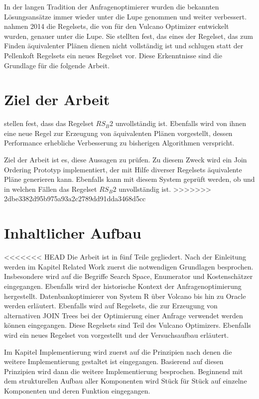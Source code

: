 In der langen Tradition der Anfragenoptimierer wurden die bekannten Lösungsansätze immer wieder unter die Lupe genommen und weiter verbessert.  \cite{shanbhag2014optimizing} nahmen 2014 die Regelsets, die von \cite{pellenkoft1997complexity} für den Vulcano Optimizer entwickelt wurden, genauer unter die Lupe. Sie stellten fest, das eines der Regelset, das zum Finden äquivalenter Plänen dienen nicht vollständig ist und schlugen statt der Pellenkoft Regelsets ein neues Regelset vor. Diese Erkenntnisse sind die Grundlage für die folgende Arbeit.

\section{Ziel der Arbeit}

\cite{shanbhag2014optimizing} stellen fest, dass das Regelset $RS_B2$ unvollständig ist. Ebenfalls wird von ihnen eine neue Regel zur Erzeugung von äquivalenten Plänen vorgestellt, dessen Performance erhebliche Verbesserung zu bisherigen Algorithmen verspricht.

Ziel der Arbeit ist es, diese Aussagen zu prüfen. Zu diesem Zweck wird ein Join Ordering Prototyp implementiert, der mit Hilfe diverser Regelsets äquivalente Pläne generieren kann. Ebenfalls kann mit diesem System geprüft werden, ob und in welchen Fällen das Regelset $RS_B2$ unvollständig ist.
>>>>>>> 2dbe3382d95b975a93a2c2789dd91dda3468d5cc







\section{Inhaltlicher Aufbau}
<<<<<<< HEAD
Die Arbeit ist in fünf Teile gegliedert. Nach der Einleitung werden im Kapitel Related Work zuerst die notwendigen Grundlagen besprochen. Insbesondere wird auf die Begriffe Search Space, Enumerator und Kostenschätzer eingegangen. Ebenfalls wird der historische Kontext der Anfragenoptimierung hergestellt. Datenbankoptimierer von System R über Volcano bis hin zu Oracle werden erläutert. Ebenfalls wird auf Regelsets, die zur Erzeugung von alternativen JOIN Trees bei der Optimierung einer Anfrage verwendet werden können eingegangen. Diese Regelsets sind Teil des Vulcano Optimizers. Ebenfalls wird ein neues Regelset von \cite{shanbhag2014optimizing} vorgestellt und der Versuchsaufbau erläutert. 

Im Kapitel Implementierung wird zuerst auf die Prinzipien nach denen die weitere Implementierung gestaltet ist eingegangen. Basierend auf diesen Prinzipien wird dann die weitere Implementierung besprochen. Beginnend mit dem strukturellen Aufbau aller Komponenten wird Stück für Stück auf einzelne Komponenten und deren Funktion eingegangen.

